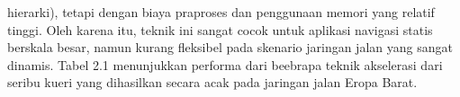 hierarki), tetapi dengan biaya praproses dan penggunaan memori yang relatif tinggi. Oleh karena itu, teknik ini sangat cocok untuk aplikasi navigasi statis berskala besar, namun kurang fleksibel pada skenario jaringan jalan yang sangat dinamis. Tabel 2.1 menunjukkan performa dari beebrapa teknik akselerasi dari seribu kueri yang dihasilkan secara acak pada jaringan jalan Eropa Barat.

